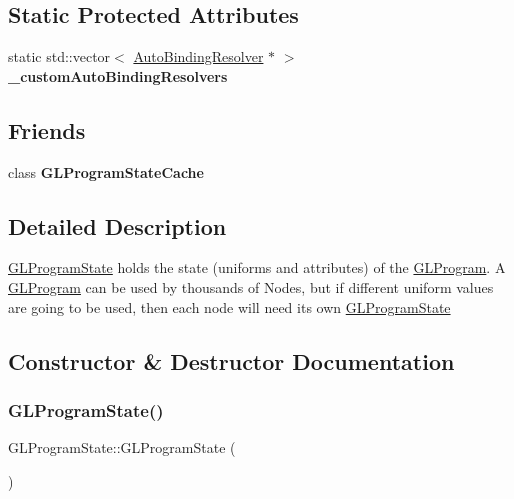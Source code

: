 \subsection*{Static Protected Attributes}
\begin{DoxyCompactItemize}
\item 
\mbox{\label{classGLProgramState_ae5be66b8c69600876a53d9df9242a690}} 
static std\+::vector$<$ \hyperlink{classGLProgramState_1_1AutoBindingResolver}{Auto\+Binding\+Resolver} $\ast$ $>$ {\bfseries \+\_\+custom\+Auto\+Binding\+Resolvers}
\end{DoxyCompactItemize}
\subsection*{Friends}
\begin{DoxyCompactItemize}
\item 
\mbox{\label{classGLProgramState_a8bbf7c4a254c0d4a51db763656717b23}} 
class {\bfseries G\+L\+Program\+State\+Cache}
\end{DoxyCompactItemize}


\subsection{Detailed Description}
\hyperlink{classGLProgramState}{G\+L\+Program\+State} holds the \textquotesingle{}state\textquotesingle{} (uniforms and attributes) of the \hyperlink{classGLProgram}{G\+L\+Program}. A \hyperlink{classGLProgram}{G\+L\+Program} can be used by thousands of Nodes, but if different uniform values are going to be used, then each node will need its own \hyperlink{classGLProgramState}{G\+L\+Program\+State} 

\subsection{Constructor \& Destructor Documentation}
\mbox{\label{classGLProgramState_ab2923b0ece19296c4ffb9222d8de9f24}} 
\subsubsection{\texorpdfstring{G\+L\+Program\+State()}{GLProgramState()}}
{\footnotesize\ttfamily G\+L\+Program\+State\+::\+G\+L\+Program\+State (\begin{DoxyParamCaption}{ }\end{DoxyParamCaption})\hspace{0.3cm}{\ttfamily [protected]}}

